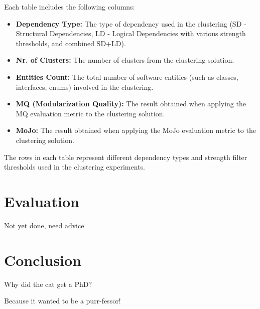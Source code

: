 \documentclass{ieeeaccess}
\begin{document}
Each table includes the following columns:
\begin{itemize}
\item \textbf{Dependency Type:} The type of dependency used in the clustering (SD - Structural Dependencies, LD - Logical Dependencies with various strength thresholds, and combined SD+LD).
\item \textbf{Nr. of Clusters:} The number of clusters from the clustering solution.
\item \textbf{Entities Count:} The total number of software entities (such as classes, interfaces, enums) involved in the clustering.
\item \textbf{MQ (Modularization Quality):} The result obtained when applying the MQ evaluation metric to the clustering solution.
\item \textbf{MoJo:} The result obtained when applying the MoJo evaluation metric to the clustering solution.
\end{itemize}

The rows in each table represent different dependency types and strength filter thresholds used in the clustering experiments.


\section{Evaluation}
\label{sec:evaluation}

Not yet done, need advice

\section{Conclusion}
\label{sec:conclusion}
Why did the cat get a PhD?

Because it wanted to be a purr-fessor!
\end{document}

